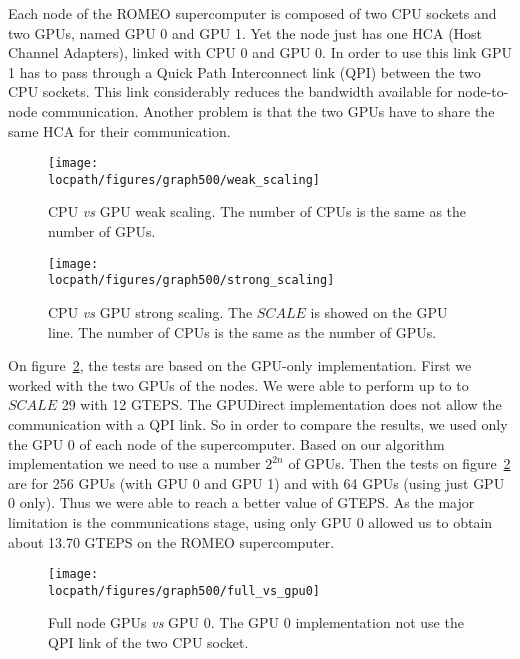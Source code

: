 Each node of the ROMEO supercomputer is composed of two CPU sockets and two GPUs, named GPU 0 and GPU 1.
Yet the node just has one HCA (Host Channel Adapters), linked with CPU 0 and GPU 0. 
In order to use this link GPU 1 has to pass through a Quick Path Interconnect link (QPI) between the two CPU sockets. 
This link considerably reduces the bandwidth available for node-to-node communication. 
Another problem is that the two GPUs have to share the same HCA for their communication. 


\begin{figure}[htb]
\begin{minipage}[b]{0.45\linewidth}
\centering
\texttt{[image: \\locpath/figures/graph500/weak\_scaling]}
\caption[]{CPU \textit{vs} GPU weak scaling. The number of CPUs is the same as the number of GPUs.}
\label{fig:bfs_weak_scaling}
\end{minipage}
\begin{minipage}[b]{0.45\linewidth}
\centering
\texttt{[image: \\locpath/figures/graph500/strong\_scaling]}
\caption[]{CPU \textit{vs} GPU strong scaling. The $SCALE$ is showed on the GPU line. The number of CPUs is the same as the number of GPUs.}
\label{fig:bfs_strong_scaling}
\end{minipage}
\end{figure}


On figure~\ref{fig:full_vs_gpu0}, the tests are based on the GPU-only implementation. 
First we worked with the two GPUs of the nodes. 
We were able to perform up to to $SCALE$ 29 with 12 GTEPS. 
The GPUDirect implementation does not allow the communication with a QPI link. 
So in order to compare the results, we used only the GPU 0 of each node of the supercomputer. 
Based on our algorithm implementation we need to use a number $2^{2n}$ of GPUs. 
Then the tests on figure~\ref{fig:full_vs_gpu0} are for 256 GPUs (with GPU 0 and GPU 1) and with 64 GPUs (using just GPU 0 only). 
Thus we were able to reach a better value of GTEPS. 
As the major limitation is the communications stage, using only GPU 0 allowed us to obtain about 13.70 GTEPS on the ROMEO supercomputer. 

\begin{figure}[!t]
\centering
\texttt{[image: \\locpath/figures/graph500/full\_vs\_gpu0]}
\caption[]{Full node GPUs \textit{vs} GPU 0. The GPU 0 implementation not use the QPI link of the two CPU socket.}
\label{fig:full_vs_gpu0}
\end{figure}

